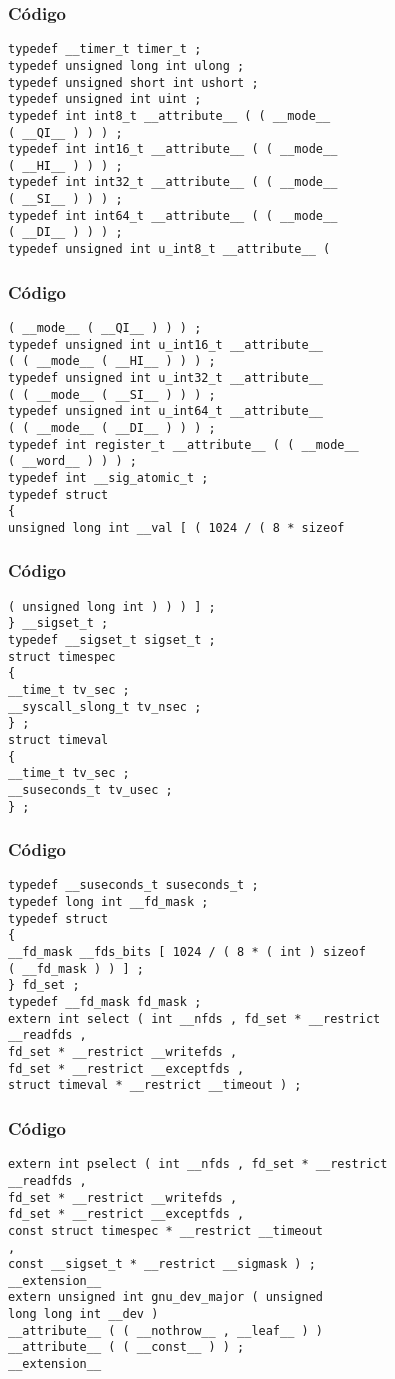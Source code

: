 \documentclass{beamer}
\begin{document}
\begin{frame}[fragile]
\frametitle{C\'odigo}
\begin{verbatim}
typedef __timer_t timer_t ; 
typedef unsigned long int ulong ; 
typedef unsigned short int ushort ; 
typedef unsigned int uint ; 
typedef int int8_t __attribute__ ( ( __mode__ 
( __QI__ ) ) ) ; 
typedef int int16_t __attribute__ ( ( __mode__ 
( __HI__ ) ) ) ; 
typedef int int32_t __attribute__ ( ( __mode__ 
( __SI__ ) ) ) ; 
typedef int int64_t __attribute__ ( ( __mode__ 
( __DI__ ) ) ) ; 
typedef unsigned int u_int8_t __attribute__ ( 
\end{verbatim}
\end{frame}
\begin{frame}[fragile]
\frametitle{C\'odigo}
\begin{verbatim}
( __mode__ ( __QI__ ) ) ) ; 
typedef unsigned int u_int16_t __attribute__ 
( ( __mode__ ( __HI__ ) ) ) ; 
typedef unsigned int u_int32_t __attribute__ 
( ( __mode__ ( __SI__ ) ) ) ; 
typedef unsigned int u_int64_t __attribute__ 
( ( __mode__ ( __DI__ ) ) ) ; 
typedef int register_t __attribute__ ( ( __mode__ 
( __word__ ) ) ) ; 
typedef int __sig_atomic_t ; 
typedef struct 
{ 
unsigned long int __val [ ( 1024 / ( 8 * sizeof 
\end{verbatim}
\end{frame}
\begin{frame}[fragile]
\frametitle{C\'odigo}
\begin{verbatim}
( unsigned long int ) ) ) ] ; 
} __sigset_t ; 
typedef __sigset_t sigset_t ; 
struct timespec 
{ 
__time_t tv_sec ; 
__syscall_slong_t tv_nsec ; 
} ; 
struct timeval 
{ 
__time_t tv_sec ; 
__suseconds_t tv_usec ; 
} ; 
\end{verbatim}
\end{frame}
\begin{frame}[fragile]
\frametitle{C\'odigo}
\begin{verbatim}
typedef __suseconds_t suseconds_t ; 
typedef long int __fd_mask ; 
typedef struct 
{ 
__fd_mask __fds_bits [ 1024 / ( 8 * ( int ) sizeof 
( __fd_mask ) ) ] ; 
} fd_set ; 
typedef __fd_mask fd_mask ; 
extern int select ( int __nfds , fd_set * __restrict 
__readfds , 
fd_set * __restrict __writefds , 
fd_set * __restrict __exceptfds , 
struct timeval * __restrict __timeout ) ; 
\end{verbatim}
\end{frame}
\begin{frame}[fragile]
\frametitle{C\'odigo}
\begin{verbatim}
extern int pselect ( int __nfds , fd_set * __restrict 
__readfds , 
fd_set * __restrict __writefds , 
fd_set * __restrict __exceptfds , 
const struct timespec * __restrict __timeout 
, 
const __sigset_t * __restrict __sigmask ) ; 
__extension__ 
extern unsigned int gnu_dev_major ( unsigned 
long long int __dev ) 
__attribute__ ( ( __nothrow__ , __leaf__ ) ) 
__attribute__ ( ( __const__ ) ) ; 
__extension__ 
\end{verbatim}
\end{frame}
\end{document}

